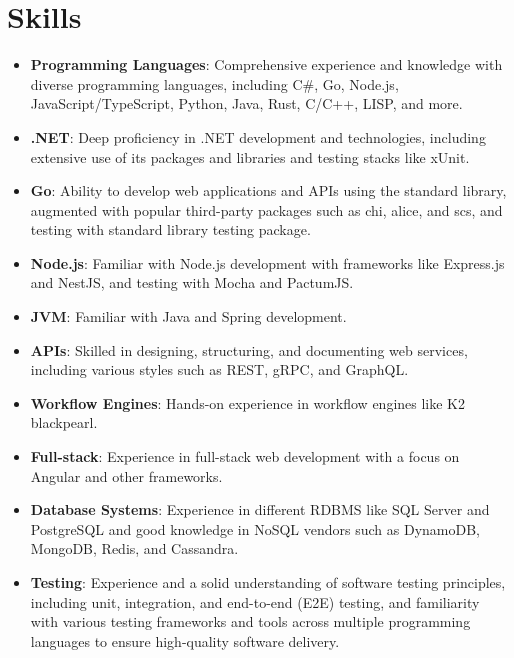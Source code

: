\documentclass[letterpaper,11pt]{article}
\begin{document}
\section{Skills}
 \begin{itemize}[leftmargin=0.15in, label={}]
    \item{\textbf{Programming Languages}{: Comprehensive experience and knowledge with diverse programming languages, including C\#, Go, Node.js, JavaScript/TypeScript, Python, Java, Rust, C/C++, LISP, and more.}}
    \vspace{-5pt}
    \item{\textbf{.NET}{: Deep proficiency in .NET development and technologies, including extensive use of its packages and libraries and testing stacks like xUnit.}}
    \vspace{-5pt}
    \item{\textbf{Go}{: Ability to develop web applications and APIs using the standard library, augmented with popular third-party packages such as chi, alice, and scs, and testing with standard library testing package.}}
    \vspace{-5pt}    
        \item{\textbf{Node.js}{: Familiar with Node.js development with frameworks like Express.js and NestJS, and testing with Mocha and PactumJS.}}
    \vspace{-5pt}  
        \item{\textbf{JVM}{: Familiar with Java and Spring development.}}
    \vspace{-5pt}        
    \item{\textbf{APIs}{: Skilled in designing, structuring, and documenting web services, including various styles such as REST, gRPC, and GraphQL.}}
    \vspace{-5pt}    
    \item{\textbf{Workflow Engines}{: Hands-on experience in workflow engines like K2 blackpearl.}}
    \vspace{-5pt}        
    \item{\textbf{Full-stack}{: Experience in full-stack web development with a focus on Angular and other frameworks.}}
    \vspace{-5pt}
    \item{\textbf{Database Systems}{: Experience in different RDBMS like SQL Server and PostgreSQL and good knowledge in NoSQL vendors such as DynamoDB, MongoDB, Redis, and Cassandra.}}
    \vspace{-5pt}  
    \item{\textbf{Testing}{: Experience and a solid understanding of software testing principles, including unit, integration, and end-to-end (E2E) testing, and familiarity with various testing frameworks and tools across multiple programming languages to ensure high-quality software delivery.}}

\end{itemize}
\end{document}
